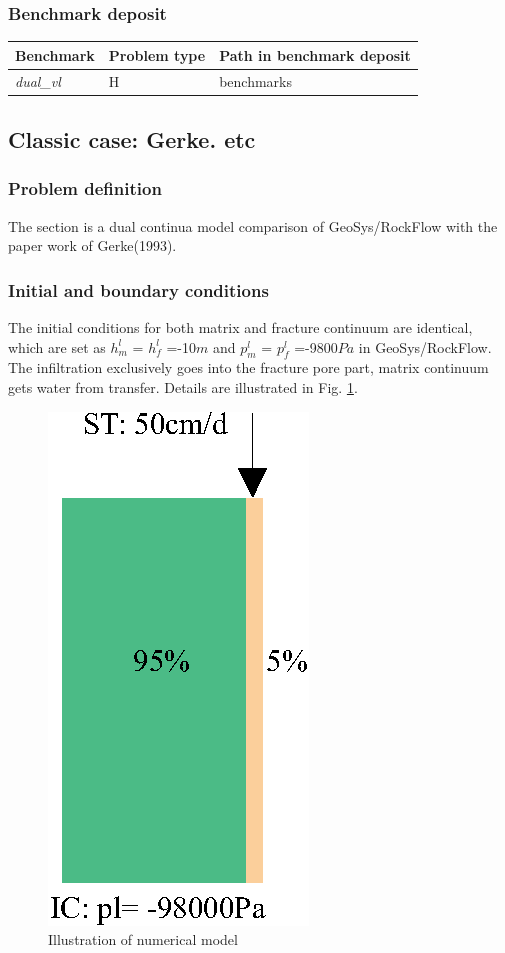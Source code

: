 \subsubsection*{Benchmark deposit}
\begin{tabular}{|l|l|l|}
  \hline
  Benchmark & Problem type & Path in benchmark deposit \\
  \hline
 \emph{dual\_vl} & H & benchmarks\verb \h_us\dual\ \\
   \hline
\end{tabular}


\subsection{Classic case: Gerke. etc}
 \label{dual-2}
\subsubsection*{Problem definition}
The section is a dual continua model comparison of GeoSys/RockFlow
with the paper work of Gerke(1993)\cite{Gerke:1993}.
%
\subsubsection*{Initial and boundary conditions}
The initial conditions for both matrix and fracture continuum are
identical, which are set as $h^l_m$ = $h^l_f$ =-10$m$ and $p^l_m$
= $p^l_f$ =-9800$Pa$ in GeoSys/RockFlow. The infiltration
exclusively goes into the fracture pore part, matrix continuum
gets water from transfer. Details are illustrated in Fig.
\ref{us:dual-1d}.
\begin{figure} [h]
 \centering
 \includegraphics[width=0.2\columnwidth] {H_US/figures/illustration_dual_1D2.eps}
 \caption{Illustration of numerical model}
 \label{us:dual-1d}
\end{figure}
